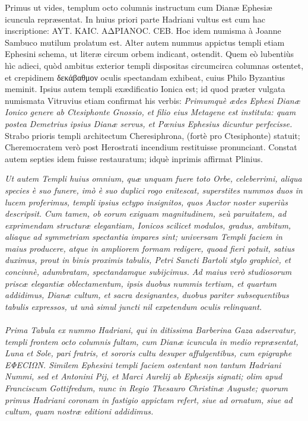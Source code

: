 \documentclass[a4paper, 11pt, oneside, polutonikogreek, latin]{article}
\begin{document}
Primus ut vides, templum octo columnis instructum cum Dianæ Ephesiæ icuncula repræsentat. In huius priori parte Hadriani vultus est cum hac inscriptione: AYT. KAIC. AΔPIANOC. CEB. Hoc idem numisma à Joanne Sambuco mutilum prolatum est. Alter autem nummus appictus templi etiam Ephesini schema, ut literæ circum orbem indicant, ostendit. Quem eò lubentiùs hìc adieci, quòd ambitus exterior templi dispositas circumcirca columnas ostentet, et crepidinem δεκάβαθμον oculis spectandam exhibeat, cuius Philo Byzantius meminit. Ipsius autem templi exædificatio Ionica est; id quod præter vulgata numismata Vitruvius etiam confirmat his verbis: \emph{Primumquè ædes Ephesi Dianæ Ionico genere ab Ctesiphonte Gnossio, et filio eius Metagene est instituta: quam postea Demetrius ipsius Dianæ servus, et Pœnius Ephesius dicuntur perfecisse.} Strabo prioris templi architectum Cheresiphrona, (fortè pro Ctesiphonte) statuit; Cheremocratem verò post Herostrati incendium restituisse pronunciant. Constat autem septies idem fuisse restauratum; idquè inprimis affirmat Plinius.

\emph{Ut autem Templi huius omnium, quæ unquam fuere toto Orbe, celeberrimi, aliqua species è suo funere, imò è suo duplici rogo enitescat, superstites nummos duos in lucem proferimus, templi ipsius ectypo insignitos, quos Auctor noster superiùs descripsit. Cum tamen, ob eorum exiguam magnitudinem, seù paruitatem, ad exprimendam structuræ elegantiam, Ionicos scilicet modulos, gradus, ambitum, aliaque ad symmetriam spectantia impares sint; universam Templi faciem in maius producere, atque in ampliorem formam redigere, quoad fieri potuit, satius duximus, prout in binis proximis tabulis, Petri Sancti Bartoli stylo graphicè, et concinnè, adumbratam, spectandamque subijcimus. Ad maius verò studiosorum priscæ elegantiæ oblectamentum, ipsis duobus nummis tertium, et quartum addidimus, Dianæ cultum, et sacra designantes, duobus pariter subsequentibus tabulis expressos, ut unà simul juncti nil expetendum oculis relinquant.}
\clearpage
\paragraph{}
\emph{Prima Tabula ex nummo Hadriani, qui in ditissima Barberina Gaza adservatur, templi frontem octo columnis fultam, cum Dianæ icuncula in medio repræsentat, Luna et Sole, pari fratris, et sororis cultu desuper affulgentibus, cum epigraphe EΦECIΩN. Similem Ephesini templi faciem ostentant non tantum Hadriani Nummi, sed et Antonini Pij, et Marci Aurelij ab Ephesijs signati; olim apud Franciscum Gottifredum, nunc in Regio Thesauro Christinæ Auguste; quorum primus Hadriani coronam in fastigio appictam refert, siue ad ornatum, siue ad cultum, quam nostræ editioni addidimus.}
\end{document}
